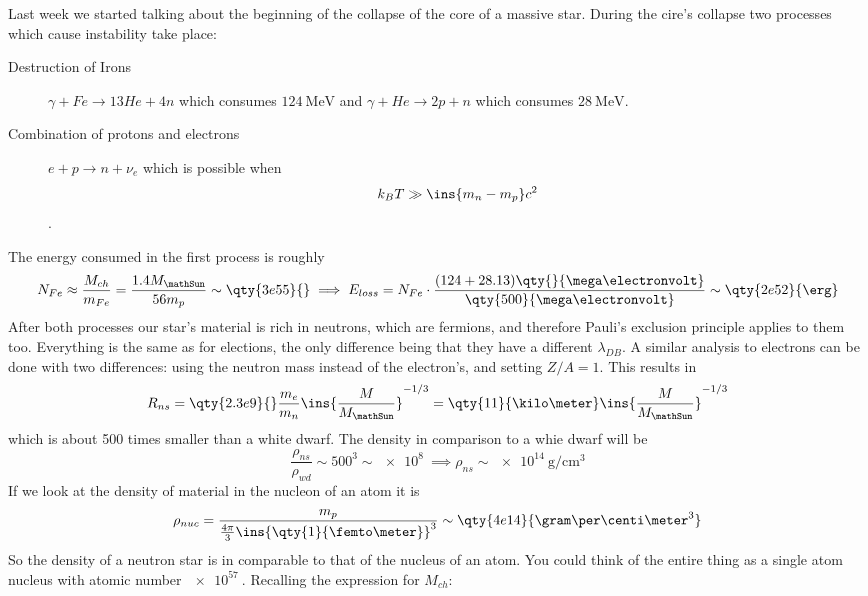 Last week we started talking about the beginning of the collapse of the core of a massive star. During the cire's collapse two processes which cause instability take place:
\begin{description}
    \item[Destruction of Irons] \(\gamma + Fe \rightarrow 13He + 4n\) which consumes \(\qty{124}{\mega\electronvolt}\) and  \(\gamma + He \rightarrow 2p + n\) which consumes \(\qty{28}{\mega\electronvolt}\).
    \item[Combination of protons and electrons] \(e + p \rightarrow n + \nu_e\) which is possible when \begin{equation*}k_B T \gg \ins{m_n-m_p}c^2\end{equation*}.
\end{description}
The energy consumed in the first process is roughly
\begin{equation}
    N_{Fe} \approx \frac{M_{ch}}{m_{Fe}} = \frac{1.4M_\mathSun}{56m_p} \sim \qty{3e55}{} \implies E_{loss} = N_{Fe}\cdot\frac{(124+28.13)\qty{}{\mega\electronvolt}}{\qty{500}{\mega\electronvolt}} \sim \qty{2e52}{\erg}
\end{equation}
After both processes our star's material is rich in neutrons, which are fermions, and therefore Pauli's exclusion principle applies to them too. Everything is the same as for elections, the only difference being that they have a different \(\lambda_{DB}\). A similar analysis to electrons can be done with two differences: using the neutron mass instead of the electron's, and setting \(Z/A=1\). This results in
\begin{align}
    R_{ns} = \qty{2.3e9}{}\frac{m_e}{m_n}\ins{\frac{M}{M_\mathSun}}^{-1/3} = \qty{11}{\kilo\meter}\ins{\frac{M}{M_\mathSun}}^{-1/3}
\end{align}
which is about 500 times smaller than a white dwarf. The density in comparison to a whie dwarf will be
\begin{equation}
    \frac{\rho_{ns}}{\rho_{wd}} \sim 500^3 \sim \qty{e8}{} \implies \rho_{ns} \sim \qty{e14}{\gram\per\centi\meter^3}
\end{equation}
If we look at the density of material in the nucleon of an atom it is
\begin{equation}
    \rho_{nuc} = \frac{m_p}{\frac{4\pi}{3}\ins{\qty{1}{\femto\meter}}^3}\sim \qty{4e14}{\gram\per\centi\meter^3}
\end{equation}
So the density of a neutron star is in comparable to that of the nucleus of an atom. You could think of the entire thing as a single atom nucleus with atomic number \(\qty{e57}{}\). Recalling the expression for \(M_{ch}\):
